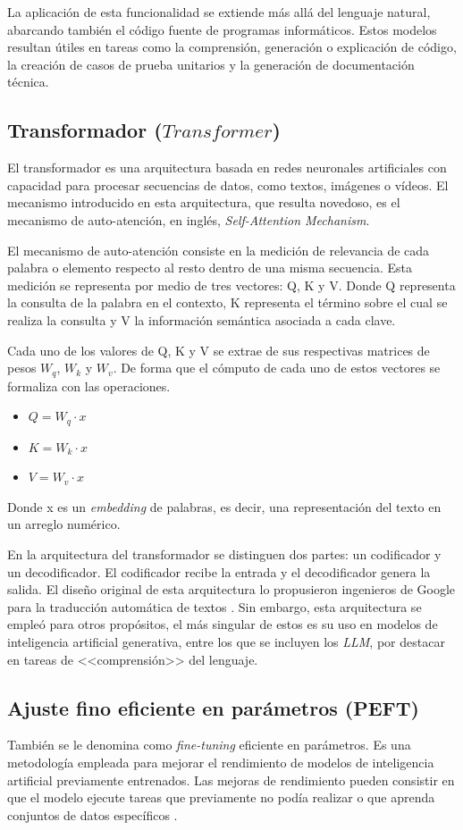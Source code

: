 \documentclass[12pt, a4paper, twoside]{article}
\begin{document}
La aplicación de esta funcionalidad se extiende más allá del lenguaje natural, abarcando también el código fuente de programas informáticos. Estos modelos resultan útiles en tareas como la comprensión, generación o explicación de código, la creación de casos de prueba unitarios y la generación de documentación técnica.

\subsection{Transformador ($\textit{Transformer}$)}
El transformador es una arquitectura basada en redes neuronales artificiales con capacidad para procesar secuencias de datos, como textos, imágenes o vídeos. El mecanismo introducido en esta arquitectura, que resulta novedoso, es el mecanismo de auto-atención, en inglés, \textit{Self-Attention Mechanism}.

El mecanismo de auto-atención consiste en la medición de relevancia de cada palabra o elemento respecto al resto dentro de una misma secuencia. Esta medición se representa por medio de tres vectores: Q, K y V. Donde Q representa la consulta de la palabra en el contexto, K representa el término sobre el cual se realiza la consulta y V la información semántica asociada a cada clave.

Cada uno de los valores de Q, K y V se extrae de sus respectivas matrices de pesos $W_q$, $W_k$ y $W_v$. De forma que el cómputo de cada uno de estos vectores se formaliza con las operaciones.
\begin{itemize}
	\item $Q = W_q \cdot x$ 
	\item $K = W_k \cdot x$ 
	\item $V = W_v \cdot x$ 
\end{itemize}
Donde x es un \textit{embedding} de palabras, es decir, una representación del texto en un arreglo numérico.

En la arquitectura del transformador se distinguen dos partes: un codificador y un decodificador. El codificador recibe la entrada y el decodificador genera la salida. El diseño original de esta arquitectura lo propusieron ingenieros de Google para la traducción automática de textos \cite{Vaswani2017-lh}. Sin embargo, esta arquitectura se empleó para otros propósitos, el más singular de estos es su uso en modelos de inteligencia artificial generativa, entre los que se incluyen los \textit{LLM}, por destacar en tareas de <<comprensión>> del lenguaje.

\subsection{Ajuste fino eficiente en parámetros (PEFT)}
También se le denomina como \textit{fine-tuning} eficiente en parámetros. Es una metodología empleada para mejorar el rendimiento de modelos de inteligencia artificial previamente entrenados. Las mejoras de rendimiento pueden consistir en que el modelo ejecute tareas que previamente no podía realizar o que aprenda conjuntos de datos específicos \cite{belcic-2025}.
\end{document}
